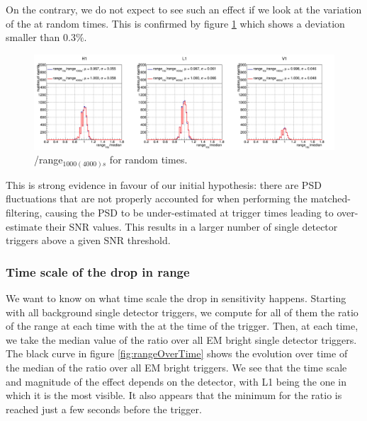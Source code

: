 On the contrary, we do not expect to see such an effect if we look at the variation of the \medr{} at random times.
This is confirmed by figure \ref{fig:rangeRatioRandomTimes} which shows a deviation smaller than $0.3\%$.
\begin{figure}[H]
  \centering
  \includegraphics[width=\linewidth]{sectionBadTriggers/PSD/Range/range_ratio/cRatioMed_switchDet.png}
  \caption{\medr{}/range$_{1000(4000)s}$ for random times.}
  \label{fig:rangeRatioRandomTimes}
\end{figure}

This is strong evidence in favour of our initial hypothesis: there are PSD fluctuations that are not properly accounted for when performing the matched-filtering, causing the PSD to be under-estimated at trigger times leading to over-estimate their SNR values.
This results in a larger number of single detector triggers above a given SNR threshold.

\subsubsection{Time scale of the drop in range}

We want to know on what time scale the drop in sensitivity happens.
Starting with all background single detector triggers, we compute for all of them the ratio of the range at each time with the \medr{} at the time of the trigger.
Then, at each time, we take the median value of the ratio over all EM bright single detector triggers.
The black curve in figure \ref{fig:rangeOverTime} shows the evolution over time of the median of the ratio over all EM bright triggers.
We see that the time scale and magnitude of the effect depends on the detector, with L1 being the one in which it is the most visible.
It also appears that the minimum for the ratio is reached just a few seconds before the trigger.

